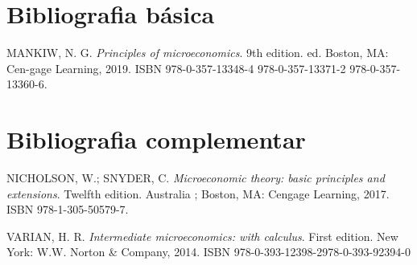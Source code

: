\documentclass[
	article,			%
	12pt,				%
	twoside,			%
	a4paper,			%
	section=TITLE,		%
	english,			%
	brazil,				%
	sumario=tradicional
]{abntex2-modelo-plano-de-aula}
\begin{document}
\section*{\textbf{Bibliografia básica}}

MANKIW, N. G. \textit{Principles of microeconomics}. 9th edition. ed. Boston, MA: Cen-gage Learning, 2019. ISBN 978-0-357-13348-4 978-0-357-13371-2 978-0-357-13360-6.

\section*{\textbf{Bibliografia complementar}}

NICHOLSON, W.; SNYDER, C. \textit{Microeconomic theory: basic principles and extensions}. Twelfth edition. Australia ; Boston, MA: Cengage Learning, 2017. ISBN 978-1-305-50579-7.

VARIAN, H. R. \textit{Intermediate microeconomics: with calculus}. First edition. New York: W.W. Norton \& Company, 2014. ISBN 978-0-393-12398-2978-0-393-92394-0
\end{document}
